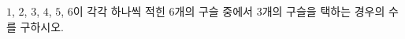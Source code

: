 \hspace*{2mm}\begin{minipage}[t]{\dimexpr\linewidth-2mm\relax}\vspace{0pt}
$1$, $2$, $3$, $4$, $5$, $6$이 각각 하나씩 적힌 $6$개의 구슬 중에서 $3$개의 구슬을 택하는 경우의 수를 구하시오.\end{minipage}
